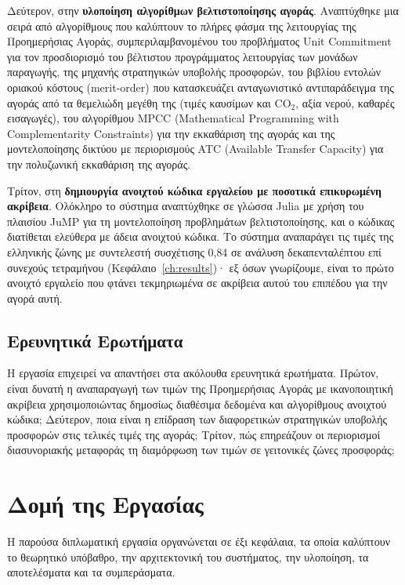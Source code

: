 Δεύτερον, στην \textbf{υλοποίηση αλγορίθμων βελτιστοποίησης αγοράς}. Αναπτύχθηκε μια σειρά από αλγορίθμους που καλύπτουν το πλήρες φάσμα της λειτουργίας της Προημερήσιας Αγοράς, συμπεριλαμβανομένου του προβλήματος Unit Commitment για τον προσδιορισμό του βέλτιστου προγράμματος λειτουργίας των μονάδων παραγωγής, της μηχανής στρατηγικών υποβολής προσφορών, του βιβλίου εντολών οριακού κόστους (merit-order) που κατασκευάζει ανταγωνιστικό αντιπαράδειγμα της αγοράς από τα θεμελιώδη μεγέθη της (τιμές καυσίμων και CO$_2$, αξία νερού, καθαρές εισαγωγές), του αλγορίθμου MPCC (Mathematical Programming with Complementarity Constraints) για την εκκαθάριση της αγοράς και της μοντελοποίησης δικτύου με περιορισμούς ATC (Available Transfer Capacity) για την πολυζωνική εκκαθάριση της αγοράς.

Τρίτον, στη \textbf{δημιουργία ανοιχτού κώδικα εργαλείου με ποσοτικά επικυρωμένη ακρίβεια}. Ολόκληρο το σύστημα αναπτύχθηκε σε γλώσσα Julia με χρήση του πλαισίου JuMP για τη μοντελοποίηση προβλημάτων βελτιστοποίησης, και ο κώδικας διατίθεται ελεύθερα με άδεια ανοιχτού κώδικα. Το σύστημα αναπαράγει τις τιμές της ελληνικής ζώνης με συντελεστή συσχέτισης 0{,}84 σε ανάλυση δεκαπενταλέπτου επί συνεχούς τετραμήνου (Κεφάλαιο~\ref{ch:results})· εξ όσων γνωρίζουμε, είναι το πρώτο ανοιχτό εργαλείο που φτάνει τεκμηριωμένα σε ακρίβεια αυτού του επιπέδου για την αγορά αυτή.

\subsection{Ερευνητικά Ερωτήματα}
\label{subsec:research-questions}

Η εργασία επιχειρεί να απαντήσει στα ακόλουθα ερευνητικά ερωτήματα. Πρώτον, είναι δυνατή η αναπαραγωγή των τιμών της Προημερήσιας Αγοράς με ικανοποιητική ακρίβεια χρησιμοποιώντας δημοσίως διαθέσιμα δεδομένα και αλγορίθμους ανοιχτού κώδικα; Δεύτερον, ποια είναι η επίδραση των διαφορετικών στρατηγικών υποβολής προσφορών στις τελικές τιμές της αγοράς; Τρίτον, πώς επηρεάζουν οι περιορισμοί διασυνοριακής μεταφοράς τη διαμόρφωση των τιμών σε γειτονικές ζώνες προσφοράς;


\section{Δομή της Εργασίας}
\label{sec:thesis-structure}

Η παρούσα διπλωματική εργασία οργανώνεται σε έξι κεφάλαια, τα οποία καλύπτουν το θεωρητικό υπόβαθρο, την αρχιτεκτονική του συστήματος, την υλοποίηση, τα αποτελέσματα και τα συμπεράσματα.

